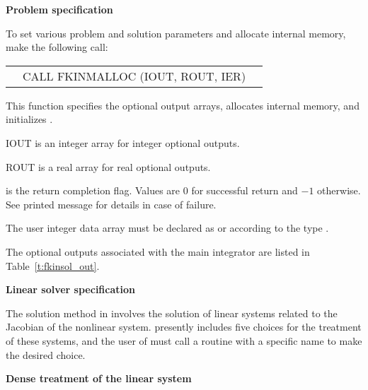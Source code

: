 \begin{Steps}
\item {\bf Problem specification}

  To set various problem and solution parameters and allocate
  internal memory, make the following call:
  {
    \begin{tabular}[t]{@{}r@{}l@{}l@{}}
        &CALL FKINMALLOC (IOUT, ROUT, IER)
    \end{tabular}
  }
  {
    This function specifies the optional output arrays,
    allocates internal memory, and initializes {\kinsol}.
  }
  {
    \begin{args}[IOUT\,]
    \item[IOUT] is an integer array for integer optional outputs.
    \item[ROUT] is a real array for real optional outputs.
    \end{args}
  }
  {
     is the return completion flag. Values are $0$ for successful return
    and $-1$ otherwise. See printed message for details in case of failure.
  }
  {
    The user integer data array  must be declared as  or
     according to the {\C} type .

    The optional outputs associated with the main {\kinsol} integrator
    are listed in Table~\ref{t:fkinsol_out}.
  }

\item\label{i:fkinsol_lin_solv_spec}{\bf Linear solver specification} 

  The solution method in {\kinsol} involves the solution of linear systems 
  related to the Jacobian of the nonlinear system. {\kinsol} presently
  includes five choices for the treatment of these systems, and the user of
  {\fkinsol} must call a routine with a specific name to make the desired
  choice.


  {\s} {\bf Dense treatment of the linear system}
  

\end{Steps}

